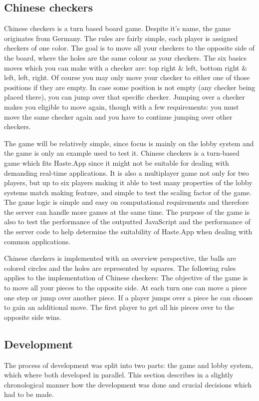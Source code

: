 \documentclass[a4paper]{article}
\begin{document}
\subsection{Chinese checkers}
\label{sec:chinesecheckers}
Chinese checkers is a turn based board game. Despite it's name, the game originates from Germany. The rules are fairly simple, each player is assigned checkers of one color. The goal is to move all your checkers to the opposite side
of the board, where the holes are the same colour as your checkers. The six basics moves which you can make with a checker are: top right \& left, bottom right \& left, left, right. Of course you may only move your checker to either one of those positions if they are empty. In case some position is not empty (any checker being placed there), you can jump over that specific checker. Jumping over a checker makes you eligible to move again, though with a few requirements: you must move the same checker again and you have to continue jumping over other checkers. 

The game will be relatively simple, since focus is mainly on the lobby system and the game is only an example used to test it. Chinese checkers is a turn-based game which fits Haste.App since it might not be suitable for dealing with demanding real-time applications. It is also a multiplayer game not only for two players, but up to six players making it able to test many properties of the lobby systems match making feature, and simple to test the scaling factor of the game. The game logic is simple and easy on computational requirements and therefore the server can handle more games at the same time. The purpose of the game is also to test the performance of the outputted JavaScript and the performance of the server code to help determine the suitability of Haste.App when dealing with common applications. 

Chinese checkers is implemented with an overview perspective, the balls are colored circles and the holes are represented by squares. The following rules applies to the implementation of Chinese checkers: The objective of the game is to move all your pieces to the opposite side. At each turn one can move a piece one step or jump over another piece. If a player jumps over a piece he can choose to gain an additional move. The first player to get all his pieces over to the opposite side wins.


\subsection{Development}
The process of development was split into two parts: the game and lobby system, which where both developed in parallel.
This section describes in a slightly chronological manner how the development was done and crucial decisions which had to be made.
\end{document}
